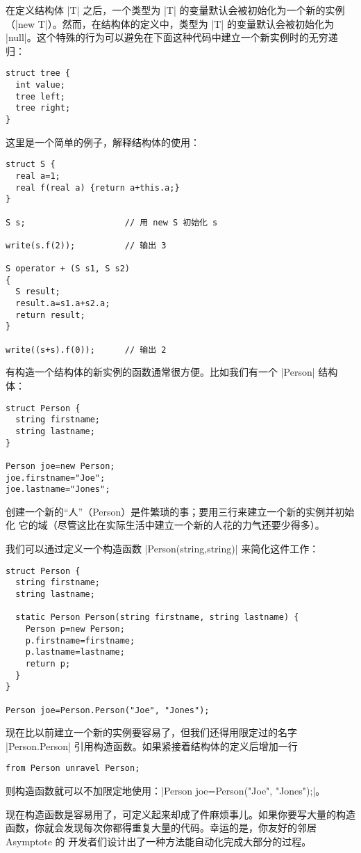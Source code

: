 \documentclass[nofonts,CJKnormalspaces]{ctexbook}[2009/05/20]
\begin{document}
在定义结构体 |T| 之后，一个类型为 |T| 的变量默认会被初始化为一个新的实例
（|new T|）。然而，在结构体的定义中，类型为 |T| 的变量默认会被初始化为
|null|。这个特殊的行为可以避免在下面这种代码中建立一个新实例时的无穷递归：
\begin{lstlisting}
struct tree {
  int value;
  tree left;
  tree right;
}
\end{lstlisting}

这里是一个简单的例子，解释结构体的使用：
\begin{lstlisting}
struct S {
  real a=1;
  real f(real a) {return a+this.a;}
}

S s;                    // 用 new S 初始化 s

write(s.f(2));          // 输出 3

S operator + (S s1, S s2)
{
  S result;
  result.a=s1.a+s2.a;
  return result;
}

write((s+s).f(0));      // 输出 2
\end{lstlisting}

有构造一个结构体的新实例的函数通常很方便。比如我们有一个 |Person| 结构体：
\begin{lstlisting}
struct Person {
  string firstname;
  string lastname;
}

Person joe=new Person;
joe.firstname="Joe";
joe.lastname="Jones";
\end{lstlisting}
创建一个新的“人”（Person）是件繁琐的事；要用三行来建立一个新的实例并初始化
它的域（尽管这比在实际生活中建立一个新的人花的力气还要少得多）。

我们可以通过定义一个构造函数 |Person(string,string)| 来简化这件工作：
\begin{lstlisting}
struct Person {
  string firstname;
  string lastname;

  static Person Person(string firstname, string lastname) {
    Person p=new Person;
    p.firstname=firstname;
    p.lastname=lastname;
    return p;
  }
}

Person joe=Person.Person("Joe", "Jones");
\end{lstlisting}

现在比以前建立一个新的实例要容易了，但我们还得用限定过的名字 |Person.Person|
引用构造函数。如果紧接着结构体的定义后增加一行
\begin{lstlisting}
from Person unravel Person;
\end{lstlisting}
则构造函数就可以不加限定地使用：|Person joe=Person("Joe", "Jones");|。

现在构造函数是容易用了，可定义起来却成了件麻烦事儿。如果你要写大量的构造
函数，你就会发现每次你都得重复大量的代码。幸运的是，你友好的邻居 Asymptote 的
开发者们设计出了一种方法能自动化完成大部分的过程。
\end{document}
